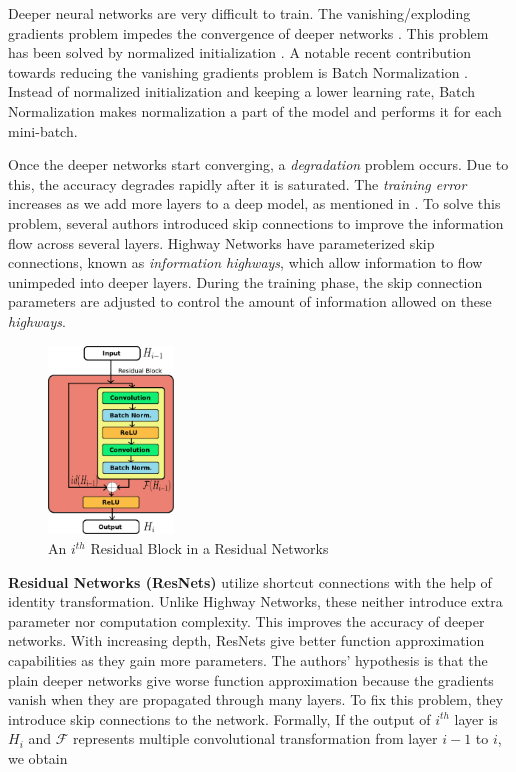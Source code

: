 \documentclass[10pt,twocolumn,letterpaper]{article}
\begin{document}
Deeper neural networks are very difficult to train. The vanishing/exploding gradients problem impedes the convergence of deeper networks \cite{[3]}. This problem has been solved by normalized initialization \cite{[3], [5], [6]}. A notable recent contribution towards reducing the vanishing gradients problem is Batch Normalization \cite{[4]}. Instead of normalized initialization and keeping a lower learning rate, Batch Normalization makes normalization a part of the model and performs it for each mini-batch. 

Once the deeper networks start converging, a \emph{degradation} problem occurs. Due to this, the accuracy degrades rapidly after it is saturated. The \emph{training error} increases as we add more layers to a deep model, as mentioned in \cite{[2]}. To solve this problem, several authors introduced skip connections to improve the information flow across several layers. Highway Networks \cite{[7]} have parameterized skip connections, known as \emph{information highways}, which allow information to flow unimpeded into deeper layers. During the training phase, the skip connection parameters are adjusted to control the amount of information allowed on these \emph{highways}.

\begin{figure}
\centering
\includegraphics[height=5cm]{Block}
\caption{An \( i^{th} \) Residual Block in a Residual Networks}
\label{fig:resblock}
\end{figure}

\textbf{Residual Networks (ResNets)} \cite{[1]} utilize shortcut connections with the help of identity transformation. Unlike Highway Networks, these neither introduce extra parameter nor computation complexity. This improves the accuracy of deeper networks. With increasing depth, ResNets give better function approximation capabilities as they gain more parameters. The authors' hypothesis is that the plain deeper networks give worse function approximation because the gradients vanish when they are propagated through many layers. To fix this problem, they introduce skip connections to the network. Formally, If the output of \( i^{th} \) layer is \( H_i \) and \( \mathcal{F} \) represents multiple convolutional transformation from layer \( i-1 \) to \( i \), we obtain
\end{document}
